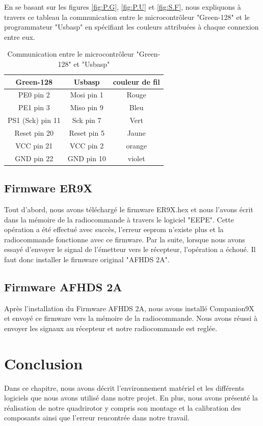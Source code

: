 	
	En se basant sur les figures \ref{fig:P.G}, \ref{fig:P.U} et \ref{fig:S.F}, nous expliquons à travers ce tableau la communication entre le microcontrôleur "Green-128" et le programmateur "Usbasp" en spécifiant les couleurs attribuées à chaque connexion entre eux.
	
	\begin{table}[H]
		\begin{center}
			\vskip 1cm
			\caption{Communication entre le microcontrôleur "Green-128" et "Usbasp" }
			\begin{tabular}{|c|c|c|}
				\hline
				\centering
				Green-128 &	Usbasp & couleur de fil \\
				\hline
				PE0 pin 2 & Mosi pin 1 & Rouge  \\
				\hline
				PE1 pin 3 & Miso pin 9 & Bleu  \\
				\hline
				PS1 (Sck)  pin 11 & Sck pin 7 & Vert  \\
				\hline
				Reset pin 20 & Reset pin 5 & Jaune \\
				\hline
				VCC pin 21 & VCC pin 2 &  orange \\
				\hline
				GND pin 22 & GND pin 10 & violet \\
				\hline
			\end{tabular}
		\end{center}
	\end{table}
	\subsection{Firmware ER9X}
	Tout d'abord, nous avons téléchargé le firmware ER9X.hex et nous l'avons écrit dans la mémoire de la radiocommande à travers le logiciel "EEPE". Cette opération a été effectué avec succès, l'erreur eeprom n'existe plus et la radiocommande fonctionne avec ce firmware. Par la suite, lorsque nous avons essayé d'envoyer le signal de l'émetteur vers le récepteur, l'opération a échoué. Il faut donc installer le firmware original "AFHDS 2A".
	\subsection{Firmware AFHDS 2A}
	Après l'installation du Firmware AFHDS 2A, nous avons installé Companion9X et envoyé ce firmware vers la mémoire de la radiocommande. Nous avons réussi à envoyer les signaux au récepteur et notre radiocommande est reglée.
	
	
	
	\section*{Conclusion}
	Dans ce chapitre, nous avons décrit l'environnement matériel et les différents logiciels que nous avons utilisé dans notre projet. En plus, nous avons présenté la réalisation de notre quadrirotor y compris son montage et la calibration des composants ainsi que l'erreur rencontrée dans notre travail.